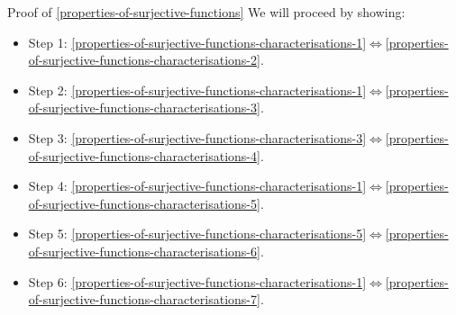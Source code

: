 \begin{Proof}{Proof of \cref{properties-of-surjective-functions}}%
    We will proceed by showing:
    \begin{itemize}
        \item Step 1: \cref{properties-of-surjective-functions-characterisations-1}$\iff$\cref{properties-of-surjective-functions-characterisations-2}.
        \item Step 2: \cref{properties-of-surjective-functions-characterisations-1}$\iff$\cref{properties-of-surjective-functions-characterisations-3}.
        \item Step 3: \cref{properties-of-surjective-functions-characterisations-3}$\iff$\cref{properties-of-surjective-functions-characterisations-4}.
        \item Step 4: \cref{properties-of-surjective-functions-characterisations-1}$\iff$\cref{properties-of-surjective-functions-characterisations-5}.
        \item Step 5: \cref{properties-of-surjective-functions-characterisations-5}$\iff$\cref{properties-of-surjective-functions-characterisations-6}.
        \item Step 6: \cref{properties-of-surjective-functions-characterisations-1}$\iff$\cref{properties-of-surjective-functions-characterisations-7}.
    \end{itemize}


\end{Proof}
